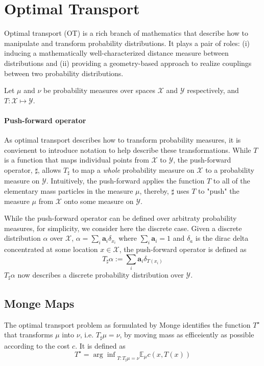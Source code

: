 \section{Optimal Transport}
Optimal transport (OT) is a rich branch of mathematics that describe how to manipulate and transform probability distributions.
It plays a pair of roles:
(i) inducing a mathematically well-characterized distance measure between distributions
and (ii) providing a geometry-based approach to realize couplings between two probability distributions.

Let $\mu$ and $\nu$ be probability measures over spaces $\mathcal{X}$ and $\mathcal{Y}$ respectively,
and $T : \mathcal{X} \mapsto \mathcal{Y}$.

\paragraph{Push-forward operator}
As optimal transport describes how to transform probability measures,
it is convienent to introduce notation to help describe these transformations.
While $T$ is a function that maps individual points from $\mathcal{X}$ to $\mathcal{Y}$,
the push-forward operator, $\sharp$, allows $T_\sharp$ to
map a \emph{whole} probability measure on $\mathcal{X}$ to a probability measure on $\mathcal{Y}$.
Intuitively, the push-forward applies the function $T$ to all of the elementary mass particles in the measure $\mu$,
thereby, $\sharp$ uses $T$ to "push" the measure $\mu$ from $\mathcal{X}$ onto some measure on $\mathcal{Y}$.

While the push-forward operator can be defined over arbitraty probability measures, %
for simplicity, we consider here the discrete case.
Given a discrete distribution $\alpha$ over $\mathcal{X}$, $\alpha = \sum_i \mathbf{a}_i \delta_{x_i}$
where $\sum_i \mathbf{a}_i = 1$ and $\delta_a$ is the dirac delta concentrated at some location $x \in \mathcal{X}$,
the push-forward operator is defined as 
\begin{equation}
  \label{eq:def-pushfwd}
  T_\sharp\alpha := \sum_i \mathbf{a}_i \delta_{T(x_i)}
\end{equation}
$T_\sharp\alpha$ now describes a discrete probability distribution over $\mathcal{Y}$.

\subsection{Monge Maps}
The optimal transport problem as formulated by Monge identifies the function
$T^\star$ that transforms $\mu$ into $\nu$, i.e. $T_\sharp \mu = \nu$,
by moving mass as efficeiently as possible according to the cost $c$.
It is defined as
\begin{equation}
  T^\star = {\arg \inf}_{T : T_\sharp \mu = \nu} \mathbb{E}_\mu c(x, T(x))
  \label{eq:monge}
\end{equation}

